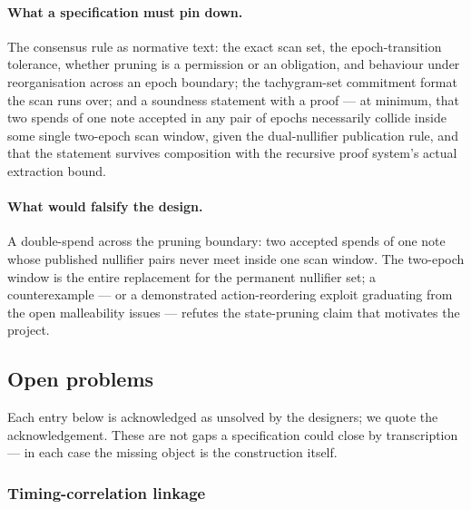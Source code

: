\documentclass[11pt,a4paper]{article}
\theoremstyle{definition}
\begin{document}
\paragraph{What a specification must pin down.} The consensus rule as
normative text: the exact scan set, the epoch-transition tolerance, whether
pruning is a permission or an obligation, and behaviour under
reorganisation across an epoch boundary; the tachygram-set commitment
format the scan runs over; and a soundness statement with a proof --- at
minimum, that two spends of one note accepted in any pair of epochs
necessarily collide inside some single two-epoch scan window, given the
dual-nullifier publication rule, and that the statement survives
composition with the recursive proof system's actual extraction bound.

\paragraph{What would falsify the design.} A double-spend across the
pruning boundary: two accepted spends of one note whose published nullifier
pairs never meet inside one scan window. The two-epoch window is the entire
replacement for the permanent nullifier set; a counterexample --- or a
demonstrated action-reordering exploit graduating from the open malleability
issues --- refutes the state-pruning claim that motivates the project.

\subsection{Open problems}\label{sec:tachyon-open}

Each entry below is acknowledged as unsolved by the designers; we quote the
acknowledgement. These are not gaps a specification could close by
transcription --- in each case the missing object is the construction
itself.

\subsubsection{Timing-correlation linkage}\label{sec:tachyon-open-timing}
\end{document}
